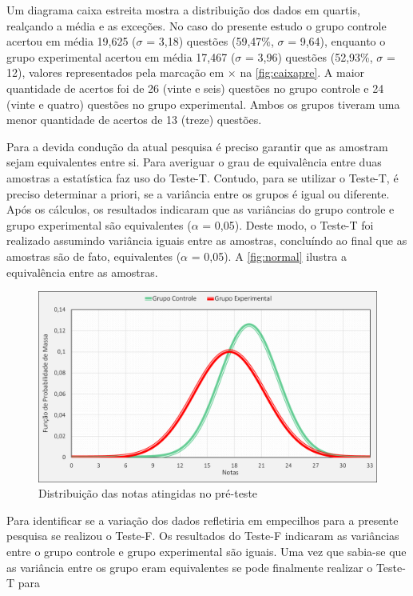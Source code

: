Um diagrama caixa estreita mostra a distribuição dos dados em quartis, realçando a média e as exceções. No caso do presente estudo o grupo controle acertou em média 19,625 ($\sigma$ = 3,18) questões (59,47\%, $\sigma$ = 9,64), enquanto o grupo experimental acertou em média 17,467 ($\sigma$ = 3,96) questões (52,93\%, $\sigma$ = 12), valores representados pela marcação em $\times$ na \autoref{fig:caixapre}. A maior quantidade de acertos foi de 26 (vinte e seis) questões no grupo controle e 24 (vinte e quatro) questões no grupo experimental. Ambos os grupos tiveram uma menor quantidade de acertos de 13 (treze) questões.

Para a devida condução da atual pesquisa é preciso garantir que as amostram sejam equivalentes entre si. Para averiguar o grau de equivalência entre duas amostras a estatística faz uso do Teste-T. Contudo, para se utilizar o Teste-T, é preciso determinar a priori, se a variância entre os grupos é igual ou diferente. Após os cálculos, os resultados indicaram que as  variâncias do grupo controle e grupo experimental são equivalentes ($\alpha$ = 0,05). Deste modo, o Teste-T foi realizado assumindo variância iguais entre as amostras, concluíndo ao final que as amostras são de fato, equivalentes ($\alpha$ = 0,05). A \autoref{fig:normal} ilustra a equivalência entre as amostras. 

\begin{figure}[htb]
    \centering
    \caption{\label{fig:normal}Distribuição das notas atingidas no pré-teste}
    \includegraphics[width=\linewidth]{./Visuais/Graficos1.pdf}
  
\end{figure}


Para identificar se a variação dos dados refletiria em empecilhos para a presente pesquisa se realizou o Teste-F. Os resultados do Teste-F indicaram as variâncias entre o grupo controle e grupo experimental são iguais. Uma vez que sabia-se que as variância entre os grupo eram equivalentes se pode finalmente realizar o Teste-T para 

